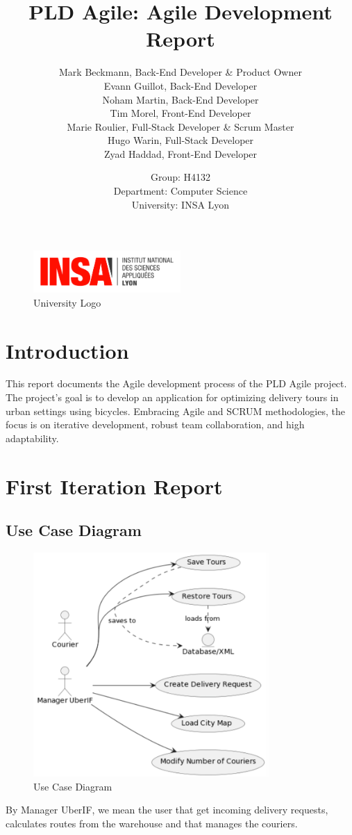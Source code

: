 \documentclass{article}
\title{PLD Agile: Agile Development Report}
\author{
    Mark Beckmann, Back-End Developer \& Product Owner \\
    Evann Guillot, Back-End Developer \\
    Noham Martin, Back-End Developer \\
    Tim Morel, Front-End Developer \\
    Marie Roulier, Full-Stack Developer \& Scrum Master \\
    Hugo Warin, Full-Stack Developer \\
    Zyad Haddad, Front-End Developer
}
\date{Group: H4132 \\ Department: Computer Science \\ University: INSA Lyon}
\begin{document}
\maketitle

\begin{figure}[ht]
\centering
\includegraphics[width=0.5\textwidth]{uni_logo.jpg}
\caption{University Logo}
\end{figure}

\newpage
\tableofcontents
\newpage

\section{Introduction}
This report documents the Agile development process of the PLD Agile project. The project's goal is to develop an application for optimizing delivery tours in urban settings using bicycles. Embracing Agile and SCRUM methodologies, the focus is on iterative development, robust team collaboration, and high adaptability.

\section{First Iteration Report}

\subsection{Use Case Diagram}
\begin{figure}[ht]
\centering
\includegraphics[width=0.8\textwidth]{useCase.png}
\caption{Use Case Diagram}
\end{figure}
By Manager UberIF, we mean the user that get incoming delivery requests, calculates routes from the warehouse and that manages the couriers.
\end{document}
